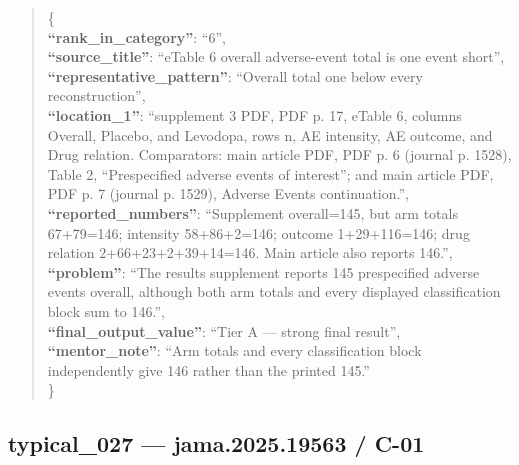 \documentclass[
  letterpaper,
  9pt]{extreport}
\begin{document}
\begin{quote}
\{\\
\textbf{``rank\_in\_category''}: ``6'',\\
\textbf{``source\_title''}: ``eTable 6 overall adverse-event total is
one event short'',\\
\textbf{``representative\_pattern''}: ``Overall total one below every
reconstruction'',\\
\textbf{``location\_1''}: ``supplement 3 PDF, PDF p. 17, eTable 6,
columns Overall, Placebo, and Levodopa, rows n, AE intensity, AE
outcome, and Drug relation. Comparators: main article PDF, PDF p. 6
(journal p. 1528), Table 2, ``Prespecified adverse events of interest'';
and main article PDF, PDF p. 7 (journal p. 1529), Adverse Events
continuation.'',\\
\textbf{``reported\_numbers''}: ``Supplement overall=145, but arm totals
67+79=146; intensity 58+86+2=146; outcome 1+29+116=146; drug relation
2+66+23+2+39+14=146. Main article also reports 146.'',\\
\textbf{``problem''}: ``The results supplement reports 145 prespecified
adverse events overall, although both arm totals and every displayed
classification block sum to 146.'',\\
\textbf{``final\_output\_value''}: ``Tier A --- strong final result'',\\
\textbf{``mentor\_note''}: ``Arm totals and every classification block
independently give 146 rather than the printed 145.''\\
\}
\end{quote}

\hypertarget{typical_027--jama202519563--c-01}{%
\subsection{typical\_027 --- jama.2025.19563 /
C-01}\label{typical_027--jama202519563--c-01}}
\end{document}
